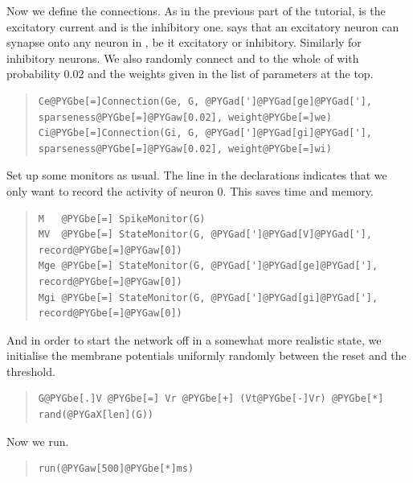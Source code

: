 \documentclass[letterpaper,10pt,english]{manual}
\begin{document}
Now we define the connections. As in the previous part of the
tutorial,  is the excitatory current and  is the inhibitory
one.  says that an excitatory neuron can synapse onto any
neuron in , be it excitatory or inhibitory. Similarly for
inhibitory neurons. We also randomly connect  and  to the whole of  with
probability 0.02 and the weights given in the list of
parameters at the top.
\begin{quote}

\begin{Verbatim}[commandchars=@\[\]]
Ce@PYGbe[=]Connection(Ge, G, @PYGad[']@PYGad[ge]@PYGad['], sparseness@PYGbe[=]@PYGaw[0.02], weight@PYGbe[=]we)
Ci@PYGbe[=]Connection(Gi, G, @PYGad[']@PYGad[gi]@PYGad['], sparseness@PYGbe[=]@PYGaw[0.02], weight@PYGbe[=]wi)
\end{Verbatim}
\end{quote}

Set up some monitors as usual. The line  in the \hyperlink{brian.StateMonitor}{}
declarations indicates that we only want to record the activity of
neuron 0. This saves time and memory.
\begin{quote}

\begin{Verbatim}[commandchars=@\[\]]
M   @PYGbe[=] SpikeMonitor(G)
MV  @PYGbe[=] StateMonitor(G, @PYGad[']@PYGad[V]@PYGad['], record@PYGbe[=]@PYGaw[0])
Mge @PYGbe[=] StateMonitor(G, @PYGad[']@PYGad[ge]@PYGad['], record@PYGbe[=]@PYGaw[0])
Mgi @PYGbe[=] StateMonitor(G, @PYGad[']@PYGad[gi]@PYGad['], record@PYGbe[=]@PYGaw[0])
\end{Verbatim}
\end{quote}

And in order to start the network off in a somewhat
more realistic state, we initialise the membrane
potentials uniformly randomly between the reset and
the threshold.
\begin{quote}

\begin{Verbatim}[commandchars=@\[\]]
G@PYGbe[.]V @PYGbe[=] Vr @PYGbe[+] (Vt@PYGbe[-]Vr) @PYGbe[*] rand(@PYGaX[len](G))
\end{Verbatim}
\end{quote}

Now we run.
\begin{quote}

\begin{Verbatim}[commandchars=@\[\]]
run(@PYGaw[500]@PYGbe[*]ms)
\end{Verbatim}
\end{quote}
\end{document}

